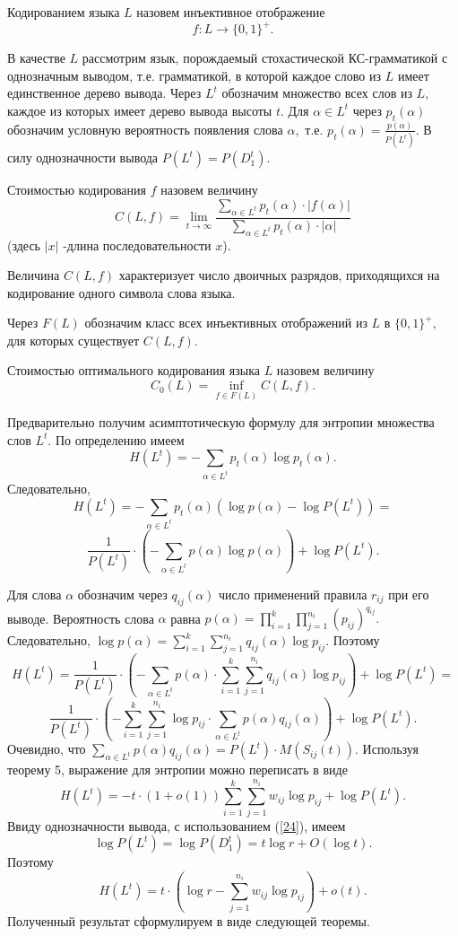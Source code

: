 \documentclass[%
11pt,a4paper]{article}
\begin{document}
{{{Кодированием языка $L$ назовем инъективное отображение
$$
f:  L \rightarrow \{ 0,1 \}^+.
$$

В качестве $L$ рассмотрим язык, порождаемый стохастической КС-грамматикой с однозначным выводом, т.е. грамматикой, в которой каждое слово из $L$ имеет единственное дерево вывода.
Через $L^t$ обозначим множество всех слов из $L,$ каждое из которых имеет дерево вывода высоты $t.$ Для $\alpha \in L^t$ через $p_t(\alpha)$
обозначим условную вероятность появления слова $\alpha,$ т.е.
$p_t(\alpha)=\frac{p(\alpha)}{P(L^t)}.$
В силу однозначности вывода $P(L^t)=P(D^t_1).$

Стоимостью кодирования $f$ назовем величину
\begin{equation}
C(L,f)= \lim_{t \rightarrow \infty}
 \frac {\sum_{ \alpha \in L^t} p_t(\alpha) \cdot
 |f(\alpha)|}
 {\sum_{ \alpha \in L^t} p_t(\alpha) \cdot | \alpha|}
\label{40}
\end{equation}
(здесь $|x|$ -длина последовательности $x$).

Величина $C(L,f)$ характеризует число двоичных разрядов,
приходящихся на кодирование одного символа слова языка.

Через $F(L)$ обозначим класс всех
инъективных отображений из $L$ в $ \{ 0,1 \}^+,$ для которых
существует $C(L,f).$

Стоимостью оптимального кодирования языка $L$ назовем величину
$$
C_0(L)= \inf_{f \in F(L)} C(L,f).
$$

Предварительно получим асимптотическую формулу для энтропии множества слов $L^t.$ По определению имеем
$$
H(L^t)=-\sum_{\alpha \in L^t} p_t(\alpha) \log p_t(\alpha).
$$
Следовательно,
$$
H(L^t)=-\sum_{\alpha \in L^t} p_t(\alpha)\left( \log p(\alpha)-\log P( L^t)\right)=
$$
$$
\frac{1}{P(L^t)}\cdot \left( -\sum_{\alpha \in L^t} p(\alpha) \log p(\alpha) \right)+\log P(L^t).
$$

Для слова $\alpha$ обозначим через $q_{ij}(\alpha)$ число применений правила $r_{ij}$ при его выводе. Вероятность слова $\alpha$ равна
$p(\alpha)=\prod_{i=1}^k \prod_{j=1}^{n_i} (p_{ij})^{q_{ij}}.$ Следовательно, $\log p(\alpha)= \sum_{i=1}^k \sum_{j=1}^{n_i} q_{ij}(\alpha) \log p_{ij}.$ Поэтому
$$
H(L^t) = \frac{1}{P(L^t)} \cdot \left( -\sum_{\alpha \in L^t} p(\alpha) \cdot \sum_{i=1}^k \sum_{j=1}^{n_i} q_{ij}(\alpha) \log p_{ij} \right)+ \log P(L^t)=
$$
$$
\frac{1}{P(L^t)} \cdot \left( - \sum_{i=1}^k \sum_{j=1}^{n_i} \log p_{ij} \cdot \sum_{\alpha \in L^t} p(\alpha) q_{ij}(\alpha)  \right)+
\log P(L^t).
$$
Очевидно, что $\sum_{\alpha \in L^t} p(\alpha) q_{ij}(\alpha) = {P(L^t)}\cdot M(S_{ij}(t)).$
Используя теорему 5, выражение для энтропии можно переписать в виде
$$
H(L^t) = -t\cdot (1+o(1))\sum_{i=1}^k \sum_{j=1}^{n_i} w_{ij}\log p_{ij} +
\log P(L^t).
$$
Ввиду однозначности вывода, с использованием (\ref{24}), имеем
$$
\log P(L^t)=\log P(D^t_1)=t \log r+O(\log t).
$$
Поэтому
$$
H(L^t) =t \cdot \left( \log r - \sum_{j=1}^{n_i} w_{ij}\log p_{ij}\right)+o(t).
$$
Полученный результат сформулируем в виде следующей теоремы.

}}}
\end{document}
